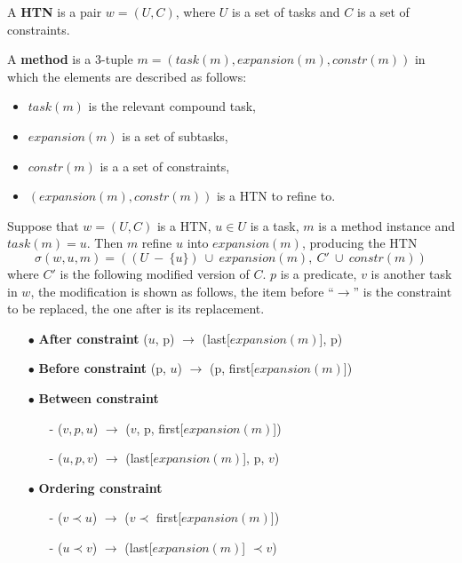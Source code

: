 
A \textbf{HTN} is a pair $w = (U, C)$, where $U$ is a set of tasks and $C$ is a set of constraints.

A \textbf{method} is a 3-tuple $m = (task(m), expansion(m), constr(m))$ in which the elements are described as follows:
\begin{itemize}\itemsep0pt \parskip0pt 
\item $task(m)$ is the relevant compound task,
\item $expansion(m)$ is a set of subtasks,
\item $constr(m)$ is a a set of constraints,
\item $(expansion(m), constr(m))$ is a HTN to refine to.
\end{itemize}

Suppose that $w = (U,C)$ is a HTN, $u \in U$ is a task, $m$ is a method instance and $task(m) = u$. Then $m$ refine $u$ into $expansion(m)$, producing the HTN
$$
\sigma(w,u,m) = ((U \ - \ \{u\}) \ \cup \ expansion(m), \ C' \ \cup \ constr(m))
$$
where $C'$ is the following modified version of $C$. $p$ is a predicate, $v$ is another task in $w$, the modification is shown as follows, the item before “$\rightarrow$” is the constraint to be replaced, the one after is its replacement.
\label{getC}
\begin{itemize}\itemsep0pt \parskip0pt 
\item[$\bullet$] \textbf{After constraint} ($u$, p) $\rightarrow$ (last[$expansion(m)$], p)
\item[$\bullet$] \textbf{Before constraint} (p, $u$) $\rightarrow$ (p, first[$expansion(m)$])
\item[$\bullet$] \textbf{Between constraint} 
    \begin{itemize}\itemsep0pt \parskip0pt 
    \item[-] ($v, p, u$) $\rightarrow$ ($v$, p, first[$expansion(m)$])
    \item[-] ($u, p, v$) $\rightarrow$ (last[$expansion(m)$], p, $v$)
    \end{itemize}
\item[$\bullet$] \textbf{Ordering constraint}
    \begin{itemize}\itemsep0pt \parskip0pt 
    \item[-] ($v \prec u$) $\rightarrow$ ($v \prec$ first[$expansion(m)$])
    \item[-] ($u \prec v$) $\rightarrow$ (last[$expansion(m)$] $\prec v$)
    \end{itemize}
\end{itemize}

